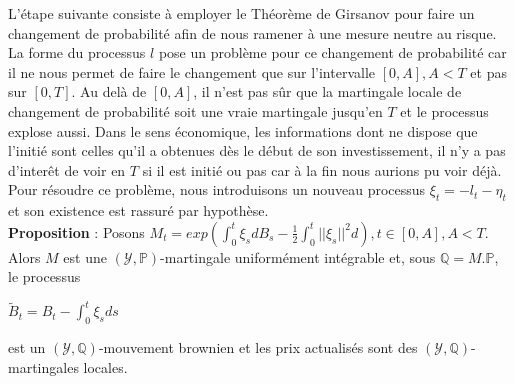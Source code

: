\documentclass[../finalreport.tex]{subfiles}
\begin{document}
L'étape suivante consiste à employer le Théorème de Girsanov pour faire un changement de probabilité afin de nous ramener à une mesure neutre au risque. La forme du processus $l$ pose un problème pour ce changement de probabilité car il ne nous permet de faire le changement que sur l'intervalle $[0, A], A <T$ et pas sur $[0, T]$. Au delà de $[0, A]$, il n'est pas sûr que la martingale locale de changement de probabilité soit une vraie martingale jusqu'en $T$ et le processus explose aussi. Dans le sens économique, les informations dont ne dispose que l'initié sont celles qu'il a obtenues dès le début de son investissement, il n'y a pas d'interêt de voir en $T$ si il est initié ou pas car à la fin nous aurions pu voir déjà. \\

Pour résoudre ce problème, nous introduisons un nouveau processus $\xi_t = -l_t - \eta_t$ et son existence est rassuré par hypothèse. \\

\textbf{Proposition} : Posons $M_t = exp( \int_{0}^{t} \xi_s dB_s - \frac{1}{2} \int_{0}^{t} ||\xi_s||^2 d), t \in [0,A] , A<T$. Alors $M$ est une $(\mathcal{Y}, \mathbb{P})$-martingale uniformément intégrable et, sous $\mathbb{Q} = M.\mathbb{P}$, le processus
\begin{center}
 $\tilde{B}_t = B_t - \displaystyle \int_{0}^{t}\xi_s ds$
 \end{center}
 est un $(\mathcal{Y}, \mathbb{Q})$-mouvement brownien et les prix actualisés sont des $(\mathcal{Y}, \mathbb{Q})$-martingales locales.
 
\end{document}
